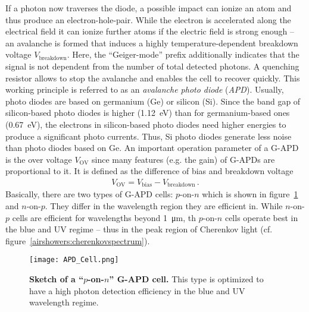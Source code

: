If a photon now traverses the diode, a possible impact can ionize an atom and thus produce an electron-hole-pair. While the electron is accelerated along the electrical field it can ionize further atoms if the electric field is strong enough -- an avalanche is formed that induces a highly temperature-dependent breakdown voltage $V_\text{breakdown}$. Here, the \enquote{Geiger-mode} prefix additionally indicates that the signal is not dependent from the number of total detected photons. A quenching resistor allows to stop the avalanche and enables the cell to recover quickly. This working principle is referred to as an \textit{avalanche photo diode} (\textit{APD}). Usually, photo diodes are based on germanium (Ge) or silicon (Si). Since the band gap of silicon-based photo diodes is higher (\SI{1.12}{\electronvolt}) than for germanium-based ones (\SI{0.67}{\electronvolt}), the electrons in silicon-based photo diodes need higher energies to produce a significant photo currents. Thus, Si photo diodes generate less noise than photo diodes based on Ge. \cite{sipm:renker_lorenz} An important operation parameter of a G-APD is the over voltage $V_\text{OV}$ since many features (e.g. the gain) of G-APDs are proportional to it. It is defined as the difference of bias and breakdown voltage~\cite{sipm:renker_lorenz}
\begin{align}
	V_\text{OV} = V_\text{bias} - V_\text{breakdown}\,.
\end{align}
Basically, there are two types of G-APD cells: $p$-on-$n$ which is shown in figure~\ref{sipm:apd_cell} and $n$-on-$p$. They differ in the wavelength region they are efficient in. While $n$-on-$p$ cells are efficient for wavelengths beyond \SI{1}{\micro\meter}, th $p$-on-$n$ cells operate best in the blue and UV regime -- thus in the peak region of Cherenkov light (cf. figure~\ref{airshowers:cherenkovspectrum}).
\begin{figure}[H]
	\centering
	\texttt{[image: APD\_Cell.png]}
	\caption[Sketch of a \enquote{$p$-on-$n$} G-APD cell]{\textbf{Sketch of a \enquote{$p$-on-$n$} G-APD cell.} \cite{sipm:renker_lorenz} This type is optimized to have a high photon detection efficiency in the blue and UV wavelength regime.}
	\label{sipm:apd_cell}	
\end{figure}

